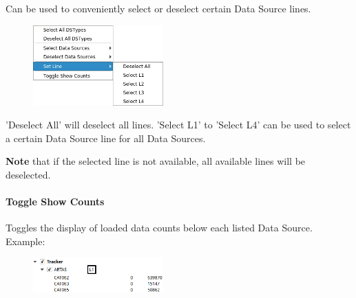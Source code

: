 Can be used to conveniently select or deselect certain Data Source lines.

\begin{figure}[H]
    \center
    \includegraphics[width=5cm,frame]{figures/ui_data_source_configmenu_lines.png}
\end{figure}

'Deselect All' will deselect all lines. 'Select L1' to 'Select L4' can be used to select a certain Data Source line for all Data Sources.

\textbf{Note} that if the selected line is not available, all available lines will be deselected.

\paragraph{Toggle Show Counts}

Toggles the display of loaded data counts below each listed Data Source. Example:

\begin{figure}[H]
    \center
    \includegraphics[width=5cm,frame]{figures/ui_data_source_configmenu_counts.png}
\end{figure}
